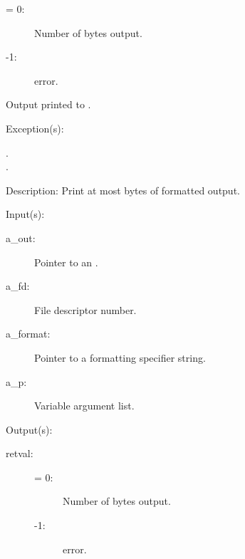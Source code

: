 \begin{capi}
\begin{capilist}
		\begin{description}\item[]
		\item[retval: ]
			\begin{description}\item[]
			\item[{\gt}= 0: ]
				Number of bytes output.
			\item[-1: ]
				 error.
			\end{description}
		\item{Output printed to .}
		\end{description}
	\item[Exception(s): ]
		\begin{description}\item[]
		\item[.]
		\item[.]
		\end{description}
	\item[Description: ]
		Print at most  bytes of formatted output.
	\end{capilist}
\label{out_put_fv}
	\begin{capilist}
	\item[Input(s): ]
		\begin{description}\item[]
		\item[a\_out: ]
			Pointer to an .
		\item[a\_fd: ]
			File descriptor number.
		\item[a\_format: ]
			Pointer to a formatting specifier string.
		\item[a\_p: ]
			Variable argument list.
		\end{description}
	\item[Output(s): ]
		\begin{description}\item[]
		\item[retval: ]
			\begin{description}\item[]
			\item[{\gt}= 0: ]
				Number of bytes output.
			\item[-1: ]
				 error.

\end{description}
\end{description}
\end{capilist}
\end{capi}
